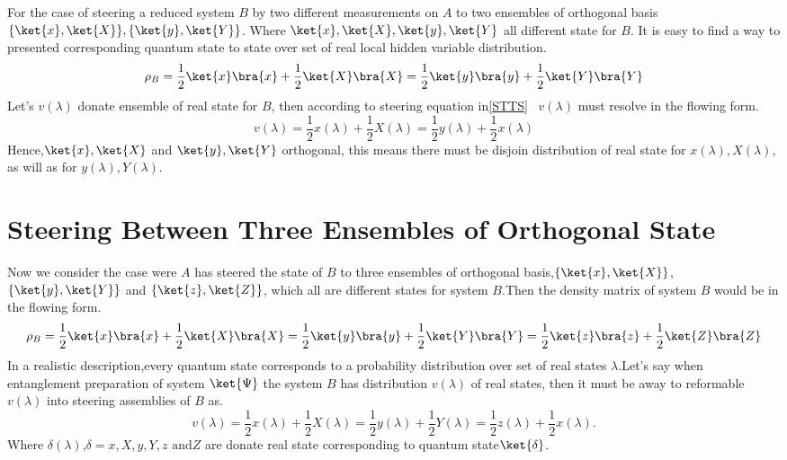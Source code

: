 For the case of steering a reduced system $B$ by two different measurements on $A$ to two ensembles of orthogonal basis $\{\ket{x},\ket{X}\},\{\ket{y},\ket{Y}\}$.
Where $\ket{x},\ket{X},\ket{y},\ket{Y}$ all different state for $B$.
It is easy to find a way to presented corresponding quantum state to state over set of real local hidden variable distribution.
\begin{equation}\label{STTS}
\rho_B=\frac{1}{2}\ket{x}\bra{x}+\frac{1}{2}\ket{X}\bra{X}=\frac{1}{2}\ket{y}\bra{y}+\frac{1}{2}\ket{Y}\bra{Y}
\end{equation}
Let's $v(\lambda)$ donate ensemble of real state for $B$, then according to steering equation in\ref{STTS} ~$v(\lambda)$ must resolve in the flowing form.
\begin{equation}
v(\lambda)=\frac{1}{2}x(\lambda)+\frac{1}{2}X(\lambda)=\frac{1}{2}y(\lambda)+\frac{1}{2}x(\lambda)
\end{equation}
Hence,$\ket{x},\ket{X}$ and $\ket{y},\ket{Y}$ orthogonal, this means there must be disjoin distribution of real state for $x(\lambda), X(\lambda)$, as will as for $y(\lambda), Y(\lambda)$.
\section{Steering Between Three Ensembles of Orthogonal State}
Now we consider the case were $A$ has steered the state of $B$ to three ensembles of orthogonal basis,$\{\ket{x},\ket{X}\}$,$\{\ket{y},\ket{Y}\}$ and $\{\ket{z},\ket{Z}\}$, which all are different states for system $B$.Then the density matrix of system $B$ would be in the flowing form.
\begin{equation}
\rho_B=\frac{1}{2}\ket{x}\bra{x}+\frac{1}{2}\ket{X}\bra{X}=\frac{1}{2}\ket{y}\bra{y}+\frac{1}{2}\ket{Y}\bra{Y}=\frac{1}{2}\ket{z}\bra{z}+\frac{1}{2}\ket{Z}\bra{Z}
\end{equation}
In a realistic description,every quantum state corresponds to a probability distribution over set of real states $\lambda$.Let's say when entanglement preparation of system $\ket{\Psi}$ the system $B$ has distribution $v(\lambda)$ of real states, then it must be away to reformable $v(\lambda)$ into steering assemblies of $B$ as.
\begin{equation}
v(\lambda)=\frac{1}{2} x(\lambda)+\frac{1}{2} X(\lambda)=\frac{1}{2} y(\lambda)+\frac{1}{2}Y(\lambda)=\frac{1}{2}z(\lambda)+\frac{1}{2}x(\lambda).
\end{equation}
Where $\delta(\lambda)$,$\delta=x,X,y,Y,z \text{ and}Z$ are donate real state corresponding to quantum state$\ket{\delta}$.

